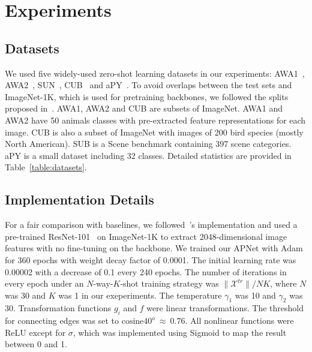 \documentclass[letterpaper]{article}
\def\Tabref#1{Table~\ref{#1}}
\begin{document}
\section{Experiments}

\subsection{Datasets}\label{sec:dataset}
We used five widely-used zero-shot learning datasets in our experiments: AWA1~\cite{lampert2013attribute}, AWA2~\cite{xian2018zero}, SUN~\cite{sun-database}, CUB~\cite{welinder2010caltech} and aPY~\cite{farhadi2009describing}.
To avoid overlaps between the test sets and ImageNet-1K, which is used for pretraining backbones, we followed the splits proposed in~\cite{xian2018zero}. AWA1, AWA2 and CUB are subsets of ImageNet.
AWA1 and AWA2 have 50 animals classes with pre-extracted feature representations for each image. CUB is also a subset of ImageNet with images of 200 bird species (mostly North American). SUB is a Scene benchmark containing 397 scene categories. aPY is a small dataset including 32 classes. Detailed statistics are provided in \Tabref{table:datasets}.





\subsection{Implementation Details}
For a fair comparison with baselines, we followed~\cite{xian2018zero}'s implementation and used a pre-trained ResNet-101~\cite{he2016deep} on ImageNet-1K to extract 2048-dimensional image features with no fine-tuning on the backbone. We trained our APNet with Adam~\cite{kingma2015adam} for 360 epochs with weight decay factor of 0.0001. The initial learning rate was 0.00002 with a decrease of 0.1 every 240 epochs. The number of iterations in every epoch under an $N$-way-$K$-shot training strategy was $\|\mathcal{X}^{tr}\| / NK$, where $N$ was 30 and $K$ was 1 in our exeperiments.
The temperature $\gamma_{1}$ was 10 and $\gamma_{2}$ was 30.
Transformation functions $g_{i}$ and $f$ were linear transformations.
The threshold for connecting edges was set to $\textrm{cosine}40^{o}~\approx~0.76$. All nonlinear functions were ReLU except for $\sigma$, which was implemented using Sigmoid to map the result between 0 and 1.
\end{document}
